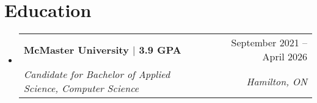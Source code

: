 \documentclass[letterpaper,11pt]{article}
\makeatletter
\newcommand{\resumeSubheading}[4]{
  \vspace{-2pt}\item
    \begin{tabular*}{0.97\textwidth}[t]{l@{\extracolsep{\fill}}r}
      \textbf{#1} & #2 \\
      \textit{\small#3} & \textit{\small #4} \\
    \end{tabular*}\vspace{-7pt}
}
\newcommand{\resumeDatedList}[2]{
    \vspace{-2pt}\item
    \begin{tabular*}{0.97\textwidth}[t]{l@{\extracolsep{\fill}}r}
        #1 & #2 \\
    \end{tabular*}
}
\newcommand{\resumeSubHeadingListStart}{\begin{itemize}[leftmargin=0.15in, label={}]}
\newcommand{\resumeSubHeadingListEnd}{\end{itemize}}
\newcommand{\resumeListStart}{\begin{itemize}[itemindent=-0.33in,leftmargin=0.48in, label={}]}
\newcommand{\resumeListEnd}{\end{itemize}}
\makeatother
\begin{document}
\section{Education}
\resumeSubHeadingListStart
\resumeSubheading
{McMaster University $|$ 3.9 GPA}{September 2021 -- April 2026}
{Candidate for Bachelor of Applied Science, Computer Science}{Hamilton, ON}
\resumeSubHeadingListEnd


%

\end{document}
